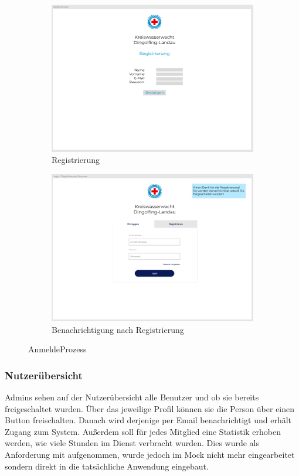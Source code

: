 \documentclass[fontsize=12pt,openright,oneside,paper=a4,BCOR=1cm]{scrbook}
\begin{document}
\begin{figure}[H]
  \centering
  \begin{subfigure}[b]{0.7\linewidth}
    \includegraphics[width=\linewidth]{Anlagen/Figma/2-Registrierung.png}
    \caption{Registrierung}
  \end{subfigure}
  \begin{subfigure}[b]{0.7\linewidth}
    \includegraphics[width=\linewidth]{Anlagen/Figma/3-LoginSuccess.png}
    \caption{Benachrichtigung nach Registrierung}
  \end{subfigure}
  \caption{AnmeldeProzess}
  \label{fig:anmeldeprozess}
\end{figure}

\subsubsection{Nutzerübersicht}
Admins sehen auf der Nutzerübersicht alle Benutzer und ob sie bereits freigeschaltet wurden. Über das jeweilige Profil können sie die Person über einen Button freischalten. Danach wird derjenige per Email benachrichtigt und erhält Zugang zum System. Außerdem soll für jedes Mitglied eine Statistik erhoben werden, wie viele Stunden im Dienst verbracht wurden. Dies wurde als Anforderung mit aufgenommen, wurde jedoch im Mock nicht mehr eingearbeitet sondern direkt in die tatsächliche Anwendung eingebaut.
\end{document}
